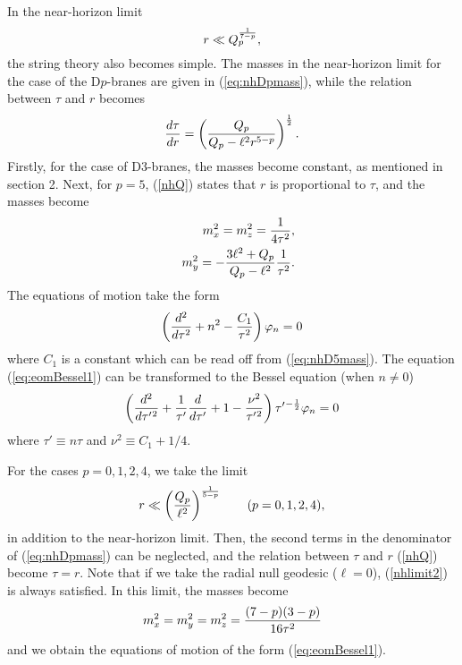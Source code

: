\documentclass[a4paper,12pt]{article}
\begin{document}
In the near-horizon limit
\begin{equation}
r\ll Q_{p}^{1\over 7-p},
\label{nhlimit}
\end{equation}
the string theory also becomes simple.
The masses in the near-horizon limit for the 
case of the D$p$-branes are given in (\ref{eq:nhDpmass}),
while the relation between $\tau$ and $r$ becomes
\begin{equation}
{d\tau\over dr}=
\left({Q_{p}\over Q_{p}-\ell^2 r^{5-p}}\right)^{1\over2}.
\label{nhQ}
\end{equation}
Firstly, for the case of D3-branes, 
the masses become constant, as mentioned in
section 2.
Next, for $p=5$, (\ref{nhQ}) states that $r$ is
proportional to $\tau$, and the masses  become 
\begin{eqnarray}
&&m_{x}^2=m_{z}^2={1\over 4\tau^{2}},\nonumber\\
&&m_{y}^2=-{3\ell^2+Q_{p}\over Q_{p}-\ell^2}{1\over \tau^2}.
\label{eq:nhD5mass}
\end{eqnarray}
The equations of motion take the form 
\begin{equation}
\left({d^2\over d\tau^2}+n^2
- {C_{1}\over \tau^{2}} \right)\varphi_{n}=0
\label{eq:eomBessel1}
\end{equation}
where $C_{1}$ is a constant which can be read off from 
(\ref{eq:nhD5mass}). The equation (\ref{eq:eomBessel1}) 
can be transformed to the Bessel equation (when $n\neq 0$)
\begin{equation}
\left({d^2\over d\tau'{}^2}+{1\over \tau'}{d\over d\tau'}
+1- {\nu^2\over \tau'{}^{2}} \right)
\tau'{}^{-{1\over 2}}\varphi_{n}=0
\end{equation}
where $\tau'\equiv n\tau$ and $\nu^2\equiv C_{1}+1/4$.

For the cases $p=0,1,2,4$, 
we take the limit
\begin{equation}
r\ll \left(Q_{p}\over \ell^2\right)^{1\over 5-p}\qquad(p=0,1,2,4),
\label{nhlimit2}
\end{equation}
in addition to the near-horizon limit.
Then, the second terms in the denominator of (\ref{eq:nhDpmass})
can be neglected, and the relation between $\tau$ and $r$ 
(\ref{nhQ}) become $\tau=r$. Note that if we take the radial 
null geodesic ($\ell=0$), (\ref{nhlimit2}) is always satisfied.
In this limit, the masses become
\begin{equation}
m_{x}^2=m_{y}^2=m_{z}^2={(7-p)(3-p)\over 16 \tau^2}
\end{equation}
and we obtain the equations of motion 
of the form (\ref{eq:eomBessel1}).
\end{document}
